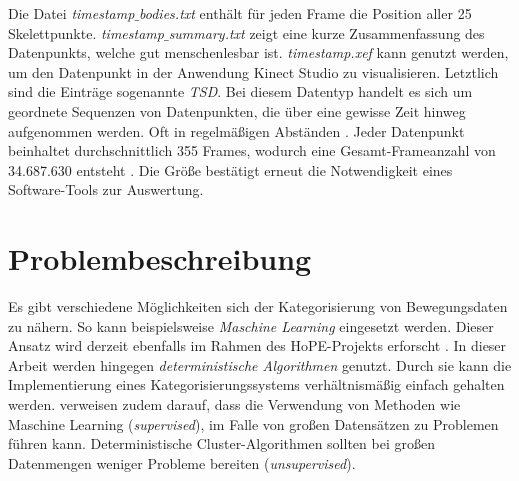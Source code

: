 Die Datei \emph{timestamp$\_$bodies.txt} enthält für jeden Frame die Position aller 25 Skelettpunkte.
\emph{timestamp$\_$summary.txt} zeigt eine kurze Zusammenfassung des Datenpunkts, welche gut menschenlesbar ist.
\emph{timestamp.xef} kann genutzt werden, um den Datenpunkt in der Anwendung Kinect Studio zu visualisieren.
Letztlich sind die Einträge sogenannte \emph{\ac{TSD}}.
Bei diesem Datentyp handelt es sich um geordnete Sequenzen von Datenpunkten,
die über eine gewisse Zeit hinweg aufgenommen werden.
Oft in regelmäßigen Abständen \citep{ali_clustering_2019}.
Jeder Datenpunkt beinhaltet durchschnittlich 355 Frames,
wodurch eine Gesamt-Frameanzahl von 34.687.630 entsteht \citep{temiz_konzeption_2022}.
Die Größe bestätigt erneut die Notwendigkeit eines Software-Tools zur Auswertung.

\section{Problembeschreibung}
\label{2-Problembeschreibung}
Es gibt verschiedene Möglichkeiten sich der Kategorisierung von Bewegungsdaten zu nähern.
So kann beispielsweise \emph{Maschine Learning} eingesetzt werden.
Dieser Ansatz wird derzeit ebenfalls im Rahmen des HoPE-Projekts erforscht \citep{plischke_master_2022}.
In dieser Arbeit werden hingegen \emph{deterministische Algorithmen} genutzt.
Durch sie kann die Implementierung eines Kategorisierungssystems verhältnismäßig einfach gehalten werden.
\citet{aghabozorgi_time-series_2015} verweisen zudem darauf, dass die Verwendung von Methoden
wie Maschine Learning (\emph{supervised}), im Falle von großen Datensätzen zu Problemen führen kann.
Deterministische Cluster-Algorithmen sollten bei großen Datenmengen weniger Probleme bereiten (\emph{unsupervised}).

